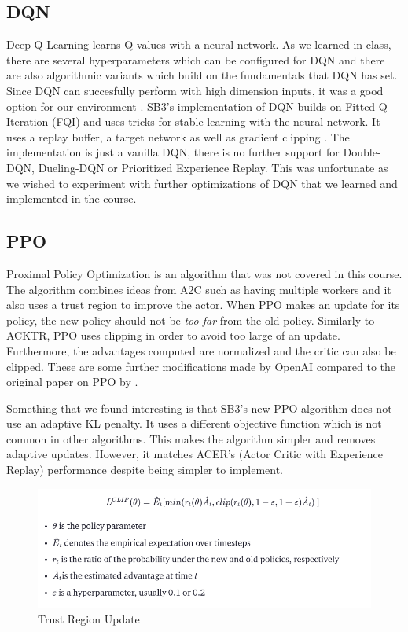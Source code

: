 \documentclass[twoside,11pt]{article}
\begin{document}
\subsection{DQN}
Deep Q-Learning learns Q values with a neural network. As we learned in class, there are several hyperparameters which can be configured for DQN and there are also algorithmic variants which build on the fundamentals that DQN has set. Since DQN can succesfully perform with high dimension inputs, it was a good option for our environment \cite{mnih2015human}. SB3's implementation of DQN builds on Fitted Q-Iteration (FQI) and uses tricks for stable learning with the neural network. It uses a replay buffer, a target network as well as gradient clipping \cite{stable-baselines3}. The implementation is just a vanilla DQN, there is no further support for Double-DQN, Dueling-DQN or Prioritized Experience Replay. This was unfortunate as we wished to experiment with further optimizations of DQN that we learned and implemented in the course.
\subsection{PPO}
Proximal Policy Optimization is an algorithm that was not covered in this course. The algorithm combines ideas from A2C such as having multiple workers and it also uses a trust region to improve the actor. When PPO makes an update for its policy, the new policy should not be \textit{too far} from the old policy. Similarly to ACKTR, PPO uses clipping in order to avoid too large of an update. Furthermore, the advantages computed are normalized and the critic can also be clipped. These are some further modifications made by OpenAI compared to the original paper on PPO by \cite{schulman2017proximal}.

Something that we found interesting is that SB3's new PPO algorithm does not use an adaptive KL penalty. It uses a different objective function which is not common in other algorithms. This makes the algorithm simpler and removes adaptive updates. However, it matches ACER's (Actor Critic with Experience Replay) performance despite being simpler to implement.

\begin{figure}[h]
       \includegraphics[scale=0.5]{trust_region_update.png}   
       \centering    
       \caption{Trust Region Update \cite{schulman_2020}}
\end{figure}
\end{document}
